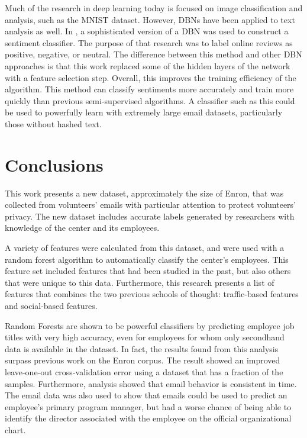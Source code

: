 \documentclass[12pt]{report}
\begin{document}
Much of the research in deep learning today is focused on image classification and analysis, such as the MNIST dataset.  However, DBNs have been applied to text analysis as well.
In \cite{ruangkanokmas_deep}, a sophisticated version of a DBN was used to construct a sentiment classifier.
The purpose of that research was to label online reviews as positive, negative, or neutral.
The difference between this method and other DBN approaches is that this work replaced some of the hidden layers of the network with a feature selection step.
Overall, this improves the training efficiency of the algorithm.
This method can classify sentiments more accurately and train more quickly than previous semi-supervised algorithms.
A classifier such as this could be used to powerfully learn with extremely large email datasets, particularly those without hashed text.



\chapter{Conclusions} \label{Conclusions}
This work presents a new dataset, approximately the size of Enron, that was collected from volunteers' emails with particular attention to protect volunteers' privacy.
The new dataset includes accurate labels generated by researchers with knowledge of the center and its employees.

A variety of features were calculated from this dataset, and were used with a random forest algorithm to automatically classify the center's employees.
This feature set included features that had been studied in the past, but also others that were unique to this data.
Furthermore, this research presents a list of features that combines the two previous schools of thought: traffic-based features and social-based features.

Random Forests are shown to be powerful classifiers by predicting employee job titles with very high accuracy, even for employees for whom only secondhand data is available in the dataset.
In fact, the results found from this analysis surpass previous work on the Enron corpus.
The result showed an improved leave-one-out cross-validation error using a dataset that has a fraction of the samples.
Furthermore, analysis showed that email behavior is consistent in time.
The email data was also used to show that emails could be used to predict an employee's primary program manager, but had a worse chance of being able to identify the director associated with the employee on the official organizational chart.
\end{document}
